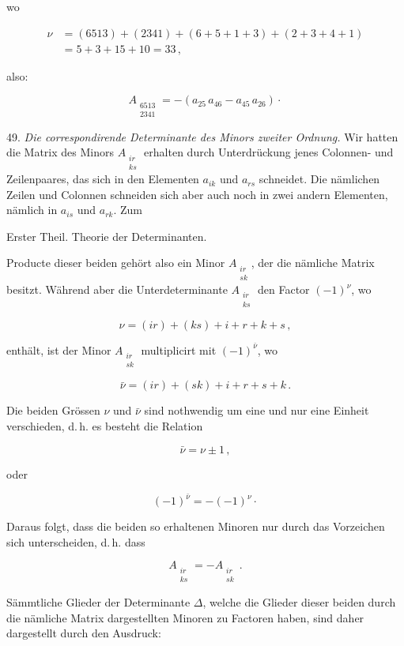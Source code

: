 wo

\[
\begin{aligned}
\nu &= (6513)+(2341)+(6+5+1+3)+(2+3+4+1) \\
    &= 5+3+15+10 = 33\,,
\end{aligned}
\]

also:

\[
A_{\substack{6513\\2341}} = -\left(a_{25}\,a_{46} - a_{45}\,a_{26}\right)\cdot
\]

49. \textit{Die correspondirende Determinante des Minors zweiter Ordnung.} Wir hatten die Matrix
des Minors $A_{\substack{ir\\ks}}$ erhalten durch Unterdr\"uckung jenes Colonnen- und
Zeilenpaares, das sich in den Elementen $a_{ik}$ und $a_{rs}$ schneidet. Die n\"amlichen Zeilen
und Colonnen schneiden sich aber auch noch in zwei andern Elementen, n\"amlich in $a_{is}$ und
$a_{rk}$. Zum


Erster Theil. Theorie der Determinanten.

Producte dieser beiden geh\"ort also ein Minor $A_{\substack{ir\\sk}}$, der die n\"amliche Matrix
besitzt. W\"ahrend aber die Unterdeterminante $A_{\substack{ir\\ks}}$ den Factor $(-1)^\nu$, wo

\[
\nu = (ir)+(ks)+i+r+k+s\,,
\]

enth\"alt, ist der Minor $A_{\substack{ir\\sk}}$ multiplicirt mit $(-1)^{\bar\nu}$, wo

\[
\bar\nu = (ir)+(sk)+i+r+s+k\,.
\]

Die beiden Gr\"ossen $\nu$ und $\bar\nu$ sind nothwendig um eine und nur eine Einheit
verschieden, d.\,h. es besteht die Relation

\[
\bar\nu = \nu \pm 1\,,
\]

oder

\[
(-1)^{\bar\nu} = -(-1)^\nu\cdot
\]

Daraus folgt, dass die beiden so erhaltenen Minoren nur durch das Vorzeichen sich unterscheiden,
d.\,h. dass

\[
A_{\substack{ir\\ks}} = -A_{\substack{ir\\sk}}\,.
\]

S\"ammtliche Glieder der Determinante $\varDelta$, welche die Glieder dieser beiden durch die
n\"amliche Matrix dargestellten Minoren zu Factoren haben, sind daher dargestellt durch den
Ausdruck:

